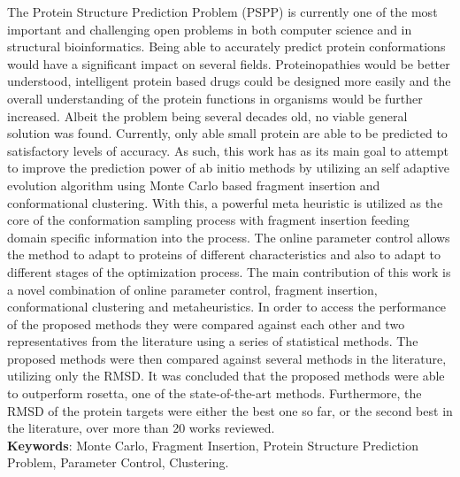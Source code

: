 \begin{resumo}
  The Protein Structure Prediction Problem (PSPP) is currently one of the
  most important and challenging open problems in both computer science and
  in structural bioinformatics. Being able to accurately predict protein
  conformations would have a significant impact on several fields.
  Proteinopathies would be better understood, intelligent protein based drugs
  could be designed more easily and the overall understanding of the protein
  functions in organisms would be further increased. Albeit the problem being
  several decades old, no viable general solution was found. Currently, only
  able small protein are able to be predicted to satisfactory levels of
  accuracy. As such, this work has as its main goal to attempt to improve the
  prediction power of ab initio methods by utilizing an self adaptive
  evolution algorithm using Monte Carlo based fragment insertion and
  conformational clustering. With this, a powerful meta heuristic is utilized
  as the core of the conformation sampling process with fragment insertion
  feeding domain specific information into the process. The online parameter
  control allows the method to adapt to proteins of different characteristics
  and also to adapt to different stages of the optimization process. The main
  contribution of this work is a novel combination of online parameter
  control, fragment insertion, conformational clustering and metaheuristics.
  In order to access the performance of the proposed methods they were
  compared against each other and two representatives from the literature using
  a series of statistical methods. The proposed methods were then compared
  against several methods in the literature, utilizing only the RMSD. It was
  concluded that the proposed methods were able to outperform rosetta, one of
  the state-of-the-art methods. Furthermore, the RMSD of the protein targets were
  either the best one so far, or the second best in the literature, over more
  than 20 works reviewed.
  \\
  \vspace{\onelineskip}
  \noindent
  \textbf{Keywords}: Monte Carlo, Fragment Insertion, Protein Structure Prediction Problem, Parameter Control, Clustering.
\end{resumo}


